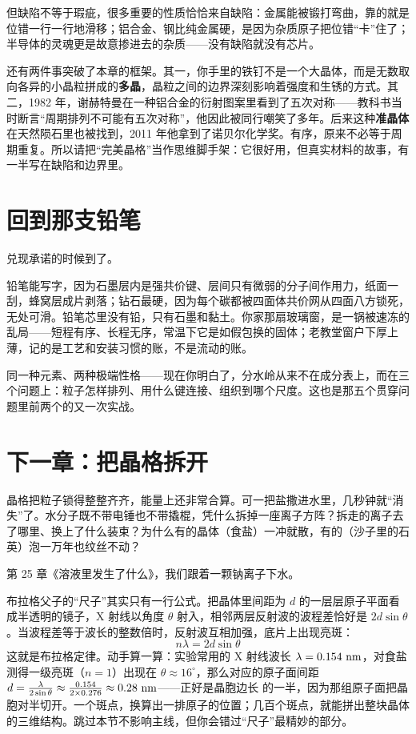 但缺陷不等于瑕疵，很多重要的性质恰恰来自缺陷：金属能被锻打弯曲，靠的就是位错一行一行地滑移；铝合金、钢比纯金属硬，是因为杂质原子把位错“卡”住了；半导体的灵魂更是故意掺进去的杂质——没有缺陷就没有芯片。

还有两件事突破了本章的框架。其一，你手里的铁钉不是一个大晶体，而是无数取向各异的小晶粒拼成的\textbf{多晶}，晶粒之间的边界深刻影响着强度和生锈的方式。其二，1982 年，谢赫特曼在一种铝合金的衍射图案里看到了五次对称——教科书当时断言“周期排列不可能有五次对称”，他因此被同行嘲笑了多年。后来这种\textbf{准晶体}在天然陨石里也被找到，2011 年他拿到了诺贝尔化学奖。有序，原来不必等于周期重复。所以请把“完美晶格”当作思维脚手架：它很好用，但真实材料的故事，有一半写在缺陷和边界里。

\section{回到那支铅笔}

兑现承诺的时候到了。

铅笔能写字，因为石墨层内是强共价键、层间只有微弱的分子间作用力，纸面一刮，蜂窝层成片剥落；钻石最硬，因为每个碳都被四面体共价网从四面八方锁死，无处可滑。铅笔芯里没有铅，只有石墨和黏土。你家那扇玻璃窗，是一锅被速冻的  乱局——短程有序、长程无序，常温下它是如假包换的固体；老教堂窗户下厚上薄，记的是工艺和安装习惯的账，不是流动的账。

同一种元素、两种极端性格——现在你明白了，分水岭从来不在成分表上，而在三个问题上：粒子怎样排列、用什么键连接、组织到哪个尺度。这也是那五个贯穿问题里前两个的又一次实战。

\section{下一章：把晶格拆开}

晶格把粒子锁得整整齐齐，能量上还非常合算。可一把盐撒进水里，几秒钟就“消失”了。水分子既不带电锤也不带撬棍，凭什么拆掉一座离子方阵？拆走的离子去了哪里、换上了什么装束？为什么有的晶体（食盐）一冲就散，有的（沙子里的石英）泡一万年也纹丝不动？

第 25 章《溶液里发生了什么》，我们跟着一颗钠离子下水。

\begin{tiaozhan}
布拉格父子的“尺子”其实只有一行公式。把晶体里间距为 $d$ 的一层层原子平面看成半透明的镜子，X 射线以角度 $\theta$ 射入，相邻两层反射波的波程差恰好是 $2d\sin\theta$。当波程差等于波长的整数倍时，反射波互相加强，底片上出现亮斑：
\[
n\lambda = 2d\sin\theta
\]
这就是布拉格定律。动手算一算：实验常用的 X 射线波长 $\lambda = 0.154\ \mathrm{nm}$，对食盐测得一级亮斑（$n=1$）出现在 $\theta \approx 16^{\circ}$，那么对应的原子面间距 $d = \frac{\lambda}{2\sin\theta} \approx \frac{0.154}{2\times 0.276} \approx 0.28\ \mathrm{nm}$——正好是晶胞边长  的一半，因为那组原子面把晶胞对半切开。一个斑点，换算出一排原子的位置；几百个斑点，就能拼出整块晶体的三维结构。跳过本节不影响主线，但你会错过“尺子”最精妙的部分。
\end{tiaozhan}

